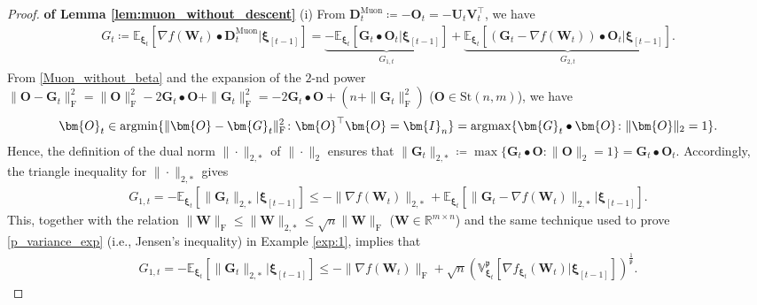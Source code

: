 \documentclass[twoside,11pt]{article}
\newcommand{\argmax}{\operatornamewithlimits{argmax}}
\newcommand{\argmin}{\operatornamewithlimits{argmin}}
\begin{document}
\begin{proof}
\textbf{of Lemma \ref{lem:muon_without_descent}} 
(i) 
From $\bm{D}_t^{\mathrm{Muon}} \coloneqq - \bm{O}_t = - \bm{U}_t \bm{V}_t^\top$, we have 
\begin{align*} 
G_t 
\coloneqq
\mathbb{E}_{\bm{\xi}_t} \left[\nabla f (\bm{W}_t) \bullet \bm{D}_t^{\mathrm{Muon}}|\bm{\xi}_{[t-1]} \right]
= 
\underbrace{- \mathbb{E}_{\bm{\xi}_t} \left[ \bm{G}_t \bullet \bm{O}_t  \Big| \bm{\xi}_{[t-1]} \right]}_{G_{1,t}}
+ \underbrace{\mathbb{E}_{\bm{\xi}_t} \left[ (\bm{G}_t - \nabla f (\bm{W}_t)) \bullet \bm{O}_t  \Big| \bm{\xi}_{[t-1]} \right]}_{G_{2,t}}.
\end{align*}
From \eqref{Muon_without_beta} and the expansion of the $2$-nd power $\| \bm{O} - \bm{G}_t \|_{\mathrm{F}}^2 = \|\bm{O} \|_{\mathrm{F}}^2 - 2 \bm{G}_t \bullet \bm{O} + \| \bm{G}_t \|_{\mathrm{F}}^2 = - 2 \bm{G}_t \bullet \bm{O} + (n + \| \bm{G}_t \|_{\mathrm{F}}^2)$ ($\bm{O} \in \mathrm{St}(n,m)$), we have 
\begin{align*}
\bm{O}_t  \in \argmin \{ \| \bm{O} - \bm{G}_t \|_{\mathrm{F}}^2 \colon \bm{O}^\top \bm{O} = \bm{I}_n  \}
= \argmax \{  \bm{G}_t \bullet \bm{O} \colon \| \bm{O} \|_2 = 1  \}. 
\end{align*} 
Hence, the definition of the dual norm $\| \cdot \|_{2,*}$ of $\| \cdot \|_{2}$ ensures that $\| \bm{G}_t \|_{2,*} \coloneqq \max \{ \bm{G}_t \bullet \bm{O} \colon \| \bm{O} \|_{2} = 1 \} = \bm{G}_t \bullet \bm{O}_t$. Accordingly, the triangle inequality for $\| \cdot \|_{2,*}$ gives 
\begin{align*}
G_{1,t} 
= - \mathbb{E}_{\bm{\xi}_t} \left[ \| \bm{G}_t \|_{2,*} | \bm{\xi}_{[t-1]} \right]
\leq 
- \| \nabla f (\bm{W}_t) \|_{2,*}
+ \mathbb{E}_{\bm{\xi}_t} \left[ \| \bm{G}_t - \nabla f(\bm{W}_t) \|_{2,*} | \bm{\xi}_{[t-1]} \right].
\end{align*}
This, together with the relation $\| \bm{W} \|_{\mathrm{F}} \leq \|\bm{W} \|_{2,*} \leq \sqrt{n} \|\bm{W}\|_{\mathrm{F}}$ ($\bm{W} \in \mathbb{R}^{m \times n}$) and the same technique used to prove \eqref{p_variance_exp} (i.e., Jensen's inequality) in Example \ref{exp:1}, implies that
\begin{align*}
G_{1,t} 
= - \mathbb{E}_{\bm{\xi}_t} \left[ \| \bm{G}_t \|_{2,*} | \bm{\xi}_{[t-1]} \right]
\leq 
- \| \nabla f (\bm{W}_t) \|_{\mathrm{F}}
+ \sqrt{n} \left( \mathbb{V}_{\bm{\xi}_t}^{\mathfrak{p}} \left[ \nabla f_{\bm{\xi}_t} (\bm{W}_t)  | \bm{\xi}_{[t-1]} \right] \right)^{\frac{1}{\mathfrak{p}}}.
\end{align*}

\end{proof}
\end{document}
